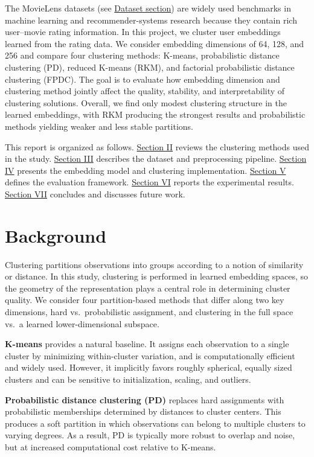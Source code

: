 \documentclass[
  11pt,
  letterpaper,
  DIV=11,
  numbers=noendperiod]{scrartcl}
\begin{document}
The MovieLens datasets (see \hyperref[sec-dataset]{Dataset section}) are
widely used benchmarks in machine learning and recommender-systems
research because they contain rich user--movie rating information. In
this project, we cluster user embeddings learned from the rating data.
We consider embedding dimensions of 64, 128, and 256 and compare four
clustering methods: K-means, probabilistic distance clustering (PD),
reduced K-means (RKM), and factorial probabilistic distance clustering
(FPDC). The goal is to evaluate how embedding dimension and clustering
method jointly affect the quality, stability, and interpretability of
clustering solutions. Overall, we find only modest clustering structure
in the learned embeddings, with RKM producing the strongest results and
probabilistic methods yielding weaker and less stable partitions.

This report is organized as follows. \hyperref[sec-background]{Section
II} reviews the clustering methods used in the study.
\hyperref[sec-dataset]{Section III} describes the dataset and
preprocessing pipeline.
\hyperref[sec-methods-and-experimental-setup]{Section IV} presents the
embedding model and clustering implementation.
\hyperref[sec-evaluation-framework]{Section V} defines the evaluation
framework. \hyperref[sec-results]{Section VI} reports the experimental
results. \hyperref[sec-conclusion-and-future-work]{Section VII}
concludes and discusses future work.

\section{Background}\label{sec-background}

Clustering partitions observations into groups according to a notion of
similarity or distance. In this study, clustering is performed in
learned embedding spaces, so the geometry of the representation plays a
central role in determining cluster quality. We consider four
partition-based methods that differ along two key dimensions, hard
vs.~probabilistic assignment, and clustering in the full space vs.~a
learned lower-dimensional subspace.

\textbf{K-means} provides a natural baseline. It assigns each
observation to a single cluster by minimizing within-cluster variation,
and is computationally efficient and widely used. However, it implicitly
favors roughly spherical, equally sized clusters and can be sensitive to
initialization, scaling, and outliers.

\textbf{Probabilistic distance clustering (PD)} replaces hard
assignments with probabilistic memberships determined by distances to
cluster centers. This produces a soft partition in which observations
can belong to multiple clusters to varying degrees. As a result, PD is
typically more robust to overlap and noise, but at increased
computational cost relative to K-means.
\end{document}
